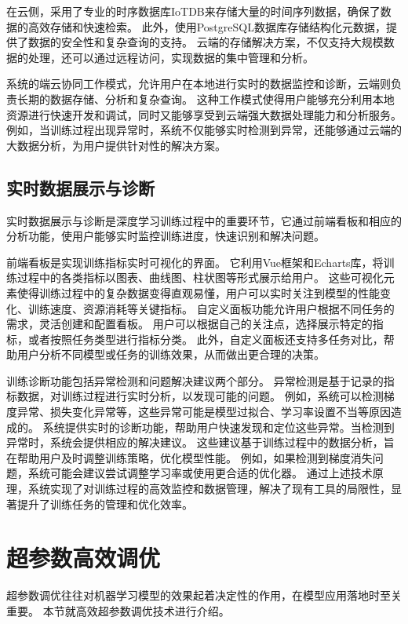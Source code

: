 在云侧，采用了专业的时序数据库IoTDB来存储大量的时间序列数据，确保了数据的高效存储和快速检索。
此外，使用PostgreSQL数据库存储结构化元数据，提供了数据的安全性和复杂查询的支持。
云端的存储解决方案，不仅支持大规模数据的处理，还可以通过远程访问，实现数据的集中管理和分析。

系统的端云协同工作模式，允许用户在本地进行实时的数据监控和诊断，云端则负责长期的数据存储、分析和复杂查询。
这种工作模式使得用户能够充分利用本地资源进行快速开发和调试，同时又能够享受到云端强大数据处理能力和分析服务。
例如，当训练过程出现异常时，系统不仅能够实时检测到异常，还能够通过云端的大数据分析，为用户提供针对性的解决方案。

\subsection{实时数据展示与诊断}

实时数据展示与诊断是深度学习训练过程中的重要环节，它通过前端看板和相应的分析功能，使用户能够实时监控训练进度，快速识别和解决问题。

前端看板是实现训练指标实时可视化的界面。
它利用Vue框架和Echarts库，将训练过程中的各类指标以图表、曲线图、柱状图等形式展示给用户。
这些可视化元素使得训练过程中的复杂数据变得直观易懂，用户可以实时关注到模型的性能变化、训练速度、资源消耗等关键指标。
自定义面板功能允许用户根据不同任务的需求，灵活创建和配置看板。
用户可以根据自己的关注点，选择展示特定的指标，或者按照任务类型进行指标分类。
此外，自定义面板还支持多任务对比，帮助用户分析不同模型或任务的训练效果，从而做出更合理的决策。

训练诊断功能包括异常检测和问题解决建议两个部分。
异常检测是基于记录的指标数据，对训练过程进行实时分析，以发现可能的问题。
例如，系统可以检测梯度异常、损失变化异常等，这些异常可能是模型过拟合、学习率设置不当等原因造成的。
系统提供实时的诊断功能，帮助用户快速发现和定位这些异常。当检测到异常时，系统会提供相应的解决建议。
这些建议基于训练过程中的数据分析，旨在帮助用户及时调整训练策略，优化模型性能。
例如，如果检测到梯度消失问题，系统可能会建议尝试调整学习率或使用更合适的优化器。
通过上述技术原理，系统实现了对训练过程的高效监控和数据管理，解决了现有工具的局限性，显著提升了训练任务的管理和优化效率。


\section{超参数高效调优}

超参数调优往往对机器学习模型的效果起着决定性的作用，在模型应用落地时至关重要。
本节就高效超参数调优技术进行介绍。

